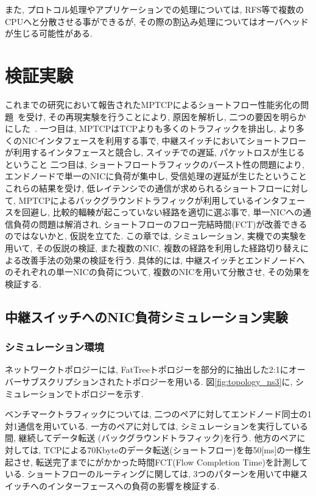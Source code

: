 \documentclass[11pt, a4paper, twocolumn]{jsarticle}
\begin{document}
また, プロトコル処理やアプリケーションでの処理については, RFS等で複数のCPUへと分散させる事ができるが,
その際の割込み処理についてはオーバヘッドが生じる可能性がある.


\section{検証実験}
\label{sec:verification}
これまでの研究において報告されたMPTCPによるショートフロー性能劣化の問題~\cite{improving}を受け, その再現実験を行うことにより,
原因を解析し, 二つの要因を明らかにした~\cite{mptcp_ana}.
一つ目は, MPTCPはTCPよりも多くのトラフィックを排出し, より多くのNICインタフェースを利用する事で,
中継スイッチにおいてショートフローが利用するインタフェースと競合し, スイッチでの遅延, パケットロスが生じるということ
二つ目は, ショートフロートラフィックのバースト性の問題により, エンドノードで単一のNICに負荷が集中し, 受信処理の遅延が生じたということ
これらの結果を受け,
低レイテンシでの通信が求められるショートフローに対して, MPTCPによるバックグラウンドトラフィックが利用しているインタフェースを回避し,
比較的輻輳が起こっていない経路を適切に選ぶ事で,
単一NICへの通信負荷の問題は解消され, ショートフローのフロー完結時間(FCT)が改善できるのではないかと, 仮説を立てた.
この章では, シミュレーション, 実機での実験を用いて, その仮説の検証,
また複数のNIC, 複数の経路を利用した経路切り替えによる改善手法の効果の検証を行う.
具体的には, 中継スイッチとエンドノードへのそれぞれの単一NICの負荷について, 複数のNICを用いて分散させ, その効果を検証する.

\subsection{中継スイッチへのNIC負荷シミュレーション実験}
\subsubsection{シミュレーション環境}

ネットワークトポロジーには,
FatTreeトポロジーを部分的に抽出した2:1にオーバーサブスクリプションされたトポロジーを用いる.
図\ref{fig:topology_ns3}に, シミュレーションでトポロジーを示す.

ベンチマークトラフィックについては, 二つのペアに対してエンドノード同士の1対1通信を用いている.
一方のペアに対しては, シミュレーションを実行している間, 継続してデータ転送 (バックグラウンドトラフィック)を行う.
他方のペアに対しては, TCPによる70Kbyteのデータ転送(ショートフロー)を毎50[ms]の一様生起させ,
転送完了までにがかかった時間FCT(Flow Completion Time)を計測している.
ショートフローのルーティングに関しては, 3つのパターンを用いて中継スイッチへのインターフェースへの負荷の影響を検証する.
\end{document}
